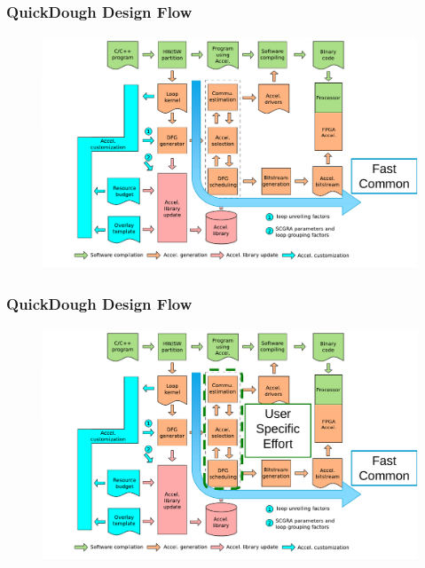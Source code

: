 \documentclass[accentcolor=tud1a,colorbacktitle,inverttitle,landscape,german,presentation,t]{tudbeamer}
\begin{document}
\begin{frame}
  \frametitle{QuickDough Design Flow}
  \begin{figure}
     \includegraphics[width=.95\linewidth]{qd-flow2}
  \end{figure}
  \end{frame}

\begin{frame}
  \frametitle{QuickDough Design Flow}
  \begin{figure}
     \includegraphics[width=.95\linewidth]{qd-flow3}
  \end{figure}
  \end{frame}
\end{document}
